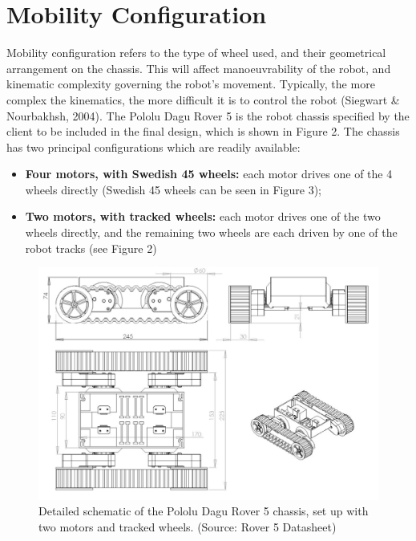\documentclass[a4paper]{article}
\begin{document}
\section{Mobility Configuration}

Mobility configuration refers to the type of wheel used, and their geometrical arrangement on the chassis. This will affect manoeuvrability of the robot, and kinematic complexity governing the robot's movement. Typically, the more complex the kinematics, the more difficult it is to control the robot (Siegwart \& Nourbakhsh, 2004). The Pololu Dagu Rover 5 is the robot chassis specified by the client to be included in the final design, which is shown in Figure 2. The chassis has two principal configurations which are readily available:
\begin{itemize}
\item \textbf{Four motors, with Swedish 45 wheels:} each motor drives one of the 4 wheels directly (Swedish 45 wheels can be seen in Figure 3);
\item \textbf{Two motors, with tracked wheels:} each motor drives one of the two wheels directly, and the remaining two wheels are each driven by one of the robot tracks (see Figure 2)
\end{itemize}

\begin{figure}[h]
\centering
\includegraphics[scale=0.28]{fig1}
\caption{Detailed schematic of the Pololu Dagu Rover 5 chassis, set up with two motors and tracked wheels. (Source: Rover 5 Datasheet)}
\end{figure}
\end{document}
